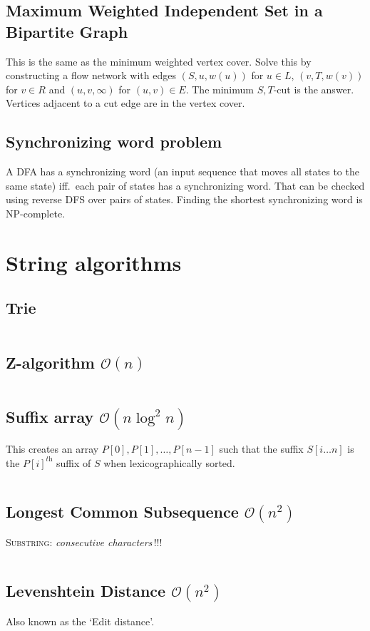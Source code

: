 \documentclass[8pt,a4paper,landscape,oneside]{amsart}
\newcommand{\code}[1]{\inputminted[fontsize=\normalsize,baselinestretch=1,breaklines,tabsize=2]{cpp}{code/#1}}
\begin{document}
\begin{multicols*}{3}
\subsection{Maximum Weighted Independent Set in a Bipartite Graph}
This is the same as the minimum weighted vertex cover. Solve this by
constructing a flow network with edges $(S,u,w(u))$ for $u\in L$,
$(v,T,w(v))$ for $v\in R$ and $(u,v,\infty)$ for $(u,v)\in E$. The
minimum $S,T$-cut is the answer. Vertices adjacent to a cut edge are
in the vertex cover.

\subsection{Synchronizing word problem}
A DFA has a synchronizing word (an input sequence that moves all states
to the same state) iff.\ each pair of states has a synchronizing word.
That can be checked using reverse DFS over pairs of states. Finding the
shortest synchronizing word is NP-complete.

\section{String algorithms}
\subsection{Trie}
\code{strings/trie.cpp}

\subsection{Z-algorithm $\mathcal{O}(n)$}
\code{strings/z_function.cpp}

\subsection{Suffix array $\mathcal{O}(n \log^2{n})$}
This creates an array $P[0], P[1], \dots, P[n-1]$ such that the suffix $S[i \dots n]$ is the $P[i]^\textit{th}$ suffix of $S$ when lexicographically sorted.
\code{strings/suffixarray.cpp}

\subsection{Longest Common Subsequence $\mathcal{O}(n^{2})$}
\textsc{Substring}: \textit{consecutive characters}\,!!!
\code{strings/lcs.cpp}

\subsection{Levenshtein Distance $\mathcal{O}(n^{2})$}
Also known as the `Edit distance'.
\code{strings/edit_dist.cpp}


\end{multicols*}
\end{document}

